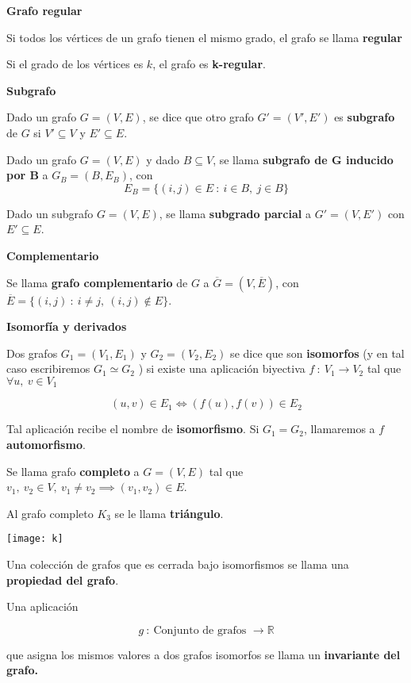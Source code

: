 \documentclass[openany]{book}
\begin{document}
\begin{definition}
  { \color{turquoise} \textbf{Grafo regular}}

  Si todos los vértices de un grafo tienen el mismo grado, el grafo se llama \textbf{regular}

  Si el grado de los vértices es $ k $, el grafo es \textbf{k-regular}.
\end{definition}


\begin{definition}
  { \color{turquoise} \textbf{Subgrafo}}

  Dado un grafo $G=(V,E)$, se dice que otro grafo $G'=(V',E')$ es \textbf{subgrafo} de $G$ si $V' \subseteq V$ y $ E' \subseteq E $.

  Dado un grafo $G=(V,E)$ y dado $B \subseteq V$, se llama \textbf{subgrafo de G inducido por B} a $G_B=(B, E_B)$, con
  $$ E_B = \{ (i,j) \in E \ : \ i \in B, \ j \in B \} $$

  Dado un subgrafo $G=(V,E)$, se llama \textbf{subgrado parcial} a $G'=(V, E')$ con $E' \subseteq E$.
\end{definition}

\begin{definition}
  { \color{turquoise} \textbf{Complementario}}

  Se llama \textbf{grafo complementario} de $G$ a $ \overline{G} = (V, \overline{E} )$, con $ \overline{E} = \{ (i,j) \ : \ i \ne j, \ (i,j) \not \in E \} $.
\end{definition}

\newpage

\begin{definition}
  { \color{turquoise} \textbf{Isomorfía y derivados}}

  Dos grafos $G_1 = (V_1, E_1)$ y $G_2 = (V_2, E_2)$ se dice que son \textbf{isomorfos} (y en tal caso escribiremos $G_1 \simeq G_2$ ) si existe una aplicación biyectiva $f \ : \ V_1 \to V_2$ tal que $ \forall u, \ v \in V_1$

  $$ (u,v) \in E_1 \iff (f(u),f(v)) \in E_2 $$

  Tal aplicación recibe el nombre de \textbf{isomorfismo}. Si $ G_1=G_2 $, llamaremos a $ f $ \textbf{automorfismo}.

  Se llama grafo \textbf{completo} a $G=(V,E)$ tal que $v_1, \ v_2 \in V, \ v_1 \ne v_2 \implies (v_1,v_2) \in E$.

  Al grafo completo $K_3$ se le llama \textbf{triángulo}.

  \begin{center}
    \texttt{[image: k]}
  \end{center}

  Una colección de grafos que es cerrada bajo isomorfismos se llama una \textbf{propiedad del grafo}.

  Una aplicación

  $$ g \ : \ \text{Conjunto de grafos }\to \mathbb{R} $$

  que asigna los mismos valores a dos grafos isomorfos se llama un \textbf{invariante del grafo.}
\end{definition}
\end{document}
